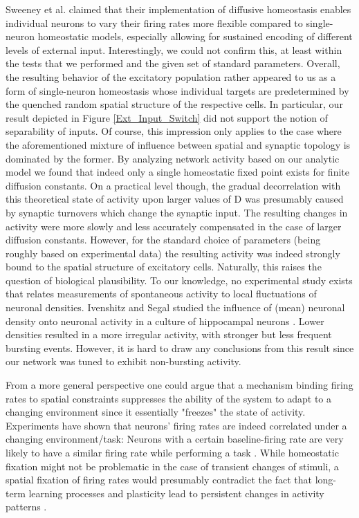 \documentclass[10pt,a4paper]{article}
\begin{document}
Sweeney et al. claimed that their implementation of diffusive homeostasis enables individual neurons to vary their firing rates more flexible compared to single-neuron homeostatic models, especially allowing for sustained encoding of different levels of external input. Interestingly, we could not confirm this, at least within the tests that we performed and the given set of standard parameters. Overall, the resulting behavior of the excitatory population rather appeared to us as a form of single-neuron homeostasis whose individual targets are predetermined by the quenched random spatial structure of the respective cells. In particular, our result depicted in Figure \ref{Ext_Input_Switch} did not support the notion of separability of inputs. Of course, this impression only applies to the case where the aforementioned mixture of influence between spatial and synaptic topology is dominated by the former. By analyzing network activity based on our analytic model we found that indeed only a single homeostatic fixed point exists for finite diffusion constants. On a practical level though, the gradual decorrelation with this theoretical state of activity upon larger values of $\mathrm{D}$ was presumably caused by synaptic turnovers which change the synaptic input. The resulting changes in activity were more slowly and less accurately compensated in the case of larger diffusion constants. However, for the standard choice of parameters (being roughly based on experimental data) the resulting activity was indeed strongly bound to the spatial structure of excitatory cells. Naturally, this raises the question of biological plausibility. To our knowledge, no experimental study exists that relates measurements of spontaneous activity to local fluctuations of neuronal densities. Ivenshitz and Segal studied the influence of (mean) neuronal density onto neuronal activity in a culture of hippocampal neurons \cite{Ivenshitz_2010}. Lower densities resulted in a more irregular activity, with stronger but less frequent bursting events. However, it is hard to draw any conclusions from this result since our network was tuned to exhibit non-bursting activity.

From a more general perspective one could argue that a mechanism binding firing rates to spatial constraints suppresses the ability of the system to adapt to a changing environment since it essentially "freezes" the state of activity. Experiments have shown that neurons' firing rates are indeed correlated under a changing environment/task: Neurons with a certain baseline-firing rate are very likely to have a similar firing rate while performing a task \cite{Buzsaki_Fir_Rates_2014}. While homeostatic fixation might not be problematic in the case of transient changes of stimuli, a spatial fixation of firing rates would presumably contradict the fact that long-term learning processes and plasticity lead to persistent changes in activity patterns \cite{Lever_Long_Term_Plast_2002}.
\end{document}
